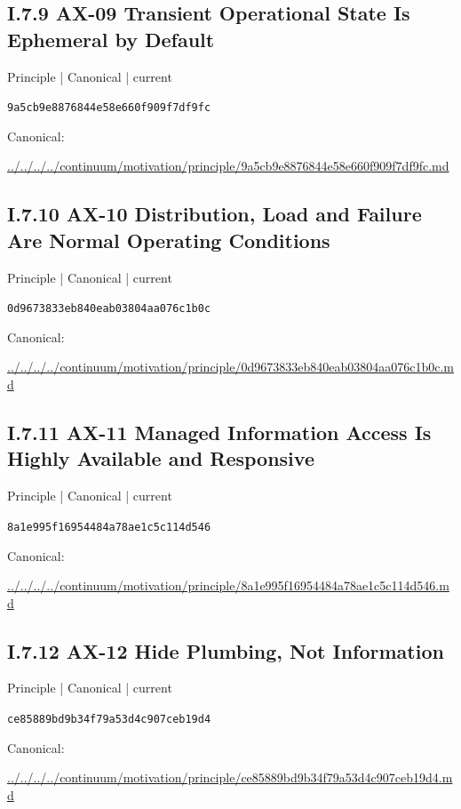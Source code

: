 \documentclass[10pt,a4paper]{article}
\begin{document}
\subsection*{I.7.9 AX-09 Transient Operational State Is Ephemeral by Default}
\label{element-9a5cb9e8876844e58e660f909f7df9fc}
{\small Principle | Canonical | current}\par
\texttt{9a5cb9e8876844e58e660f909f7df9fc}\par
Canonical: \par
{\footnotesize\url{../../../../continuum/motivation/principle/9a5cb9e8876844e58e660f909f7df9fc.md}}\par
\subsection*{I.7.10 AX-10 Distribution, Load and Failure Are Normal Operating Conditions}
\label{element-0d9673833eb840eab03804aa076c1b0c}
{\small Principle | Canonical | current}\par
\texttt{0d9673833eb840eab03804aa076c1b0c}\par
Canonical: \par
{\footnotesize\url{../../../../continuum/motivation/principle/0d9673833eb840eab03804aa076c1b0c.md}}\par
\subsection*{I.7.11 AX-11 Managed Information Access Is Highly Available and Responsive}
\label{element-8a1e995f16954484a78ae1c5c114d546}
{\small Principle | Canonical | current}\par
\texttt{8a1e995f16954484a78ae1c5c114d546}\par
Canonical: \par
{\footnotesize\url{../../../../continuum/motivation/principle/8a1e995f16954484a78ae1c5c114d546.md}}\par
\subsection*{I.7.12 AX-12 Hide Plumbing, Not Information}
\label{element-ce85889bd9b34f79a53d4c907ceb19d4}
{\small Principle | Canonical | current}\par
\texttt{ce85889bd9b34f79a53d4c907ceb19d4}\par
Canonical: \par
{\footnotesize\url{../../../../continuum/motivation/principle/ce85889bd9b34f79a53d4c907ceb19d4.md}}\par
\end{document}
